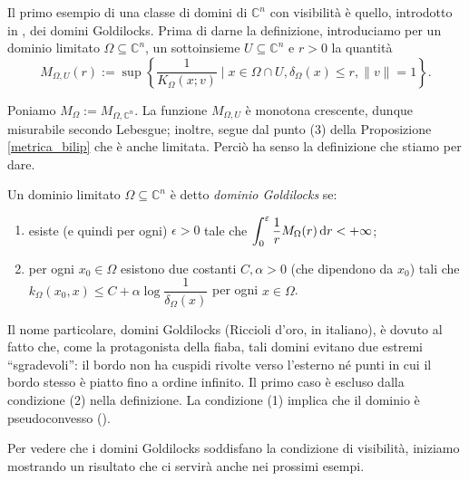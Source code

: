 Il primo esempio di una classe di domini di $\mathbb{C}^n$ con visibilità è quello, introdotto in \cite{BZ1}, dei domini Goldilocks. Prima di darne la definizione, introduciamo per un dominio limitato $\Omega\subseteq\mathbb{C}^n$, un sottoinsieme $U\subseteq\mathbb{C}^n$ e $r>0$ la quantità
$$M_{\Omega,U}(r):=\sup\left\{\frac{1}{K_\Omega(x;v)}\mid x\in\Omega\cap U,\delta_\Omega(x) \le r, \|v\|=1\right\}.$$

Poniamo $M_\Omega:=M_{\Omega,\mathbb{C}^n}$. La funzione $M_{\Omega,U}$ è monotona crescente, dunque misurabile secondo Lebesgue; inoltre, segue dal punto (3) della Proposizione \ref{metrica_bilip} che è anche limitata. Perciò ha senso la definizione che stiamo per dare.

\begin{defn} \label{gold}
    Un dominio limitato $\Omega\subseteq\mathbb{C}^n$ è detto \textit{dominio Goldilocks} se:
    \begin{enumerate}[label={(\arabic*)}]
        \item esiste (e quindi per ogni) $\epsilon>0$ tale che $\displaystyle\int_0^{\varepsilon} \frac{1}{r}M_\Omega(r)\mathop{}\!\mathrm{d} r<+\infty$;
        \item per ogni $x_0\in\Omega$ esistono due costanti $C,\alpha>0$ (che dipendono da $x_0$) tali che $k_\Omega(x_0,x) \le C+\alpha\log{\dfrac{1}{\delta_\Omega(x)}}$ per ogni $x\in\Omega$.
    \end{enumerate}
\end{defn}

\begin{oss}
    Il nome particolare, domini Goldilocks (Riccioli d'oro, in italiano), è dovuto al fatto che, come la protagonista della fiaba, tali domini evitano due estremi ``sgradevoli'': il bordo non ha cuspidi rivolte verso l'esterno né punti in cui il bordo stesso è piatto fino a ordine infinito. Il primo caso è escluso dalla condizione (2) nella definizione. La condizione (1) implica che il dominio è pseudoconvesso (\cite[Proposition 2.15]{BZ1}).
\end{oss}

Per vedere che i domini Goldilocks soddisfano la condizione di visibilità, iniziamo mostrando un risultato che ci servirà anche nei prossimi esempi.

